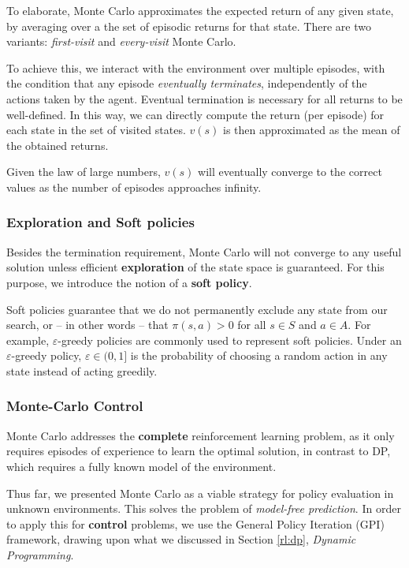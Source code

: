 To elaborate, Monte Carlo approximates the expected return of any given state, by averaging over a the set of episodic returns for that state.
There are two variants: \emph{first-visit} and \emph{every-visit} Monte Carlo.

To achieve this, we interact with the environment over multiple episodes, with the condition that any episode \emph{eventually terminates}, independently of the actions taken by the agent.
Eventual termination is necessary for all returns to be well-defined.
In this way, we can directly compute the return (per episode) for each state in the set of visited states.
$v(s)$ is then approximated as the mean of the obtained returns.

Given the law of large numbers, $v(s)$ will eventually converge to the correct values as the number of episodes approaches infinity.

\subsubsection{Exploration and Soft policies}
Besides the termination requirement, Monte Carlo will not converge to any useful solution unless efficient \textbf{exploration} of the state space is guaranteed.
For this purpose, we introduce the notion of a \textbf{soft policy}.

Soft policies guarantee that we do not permanently exclude any state from our search, or -- in other words -- that $\pi (s, a) > 0$ for all $s \in S$ and $a \in A$.
For example, $\varepsilon$-greedy policies are commonly used to represent soft policies.
Under an $\varepsilon$-greedy policy, $\varepsilon \in (0, 1]$ is the probability of choosing a random action in any state instead of acting greedily.

\subsubsection{Monte-Carlo Control}
Monte Carlo addresses the \textbf{complete} reinforcement learning problem, as it only requires episodes of experience to learn the optimal solution, in contrast to DP, which requires a fully known model of the environment.

Thus far, we presented Monte Carlo as a viable strategy for policy evaluation in unknown environments.
This solves the problem of \emph{model-free prediction}.
In order to apply this for \textbf{control} problems, we use the General Policy Iteration (GPI) framework, drawing upon what we discussed in Section \ref{rl:dp}, \emph{Dynamic Programming}.

